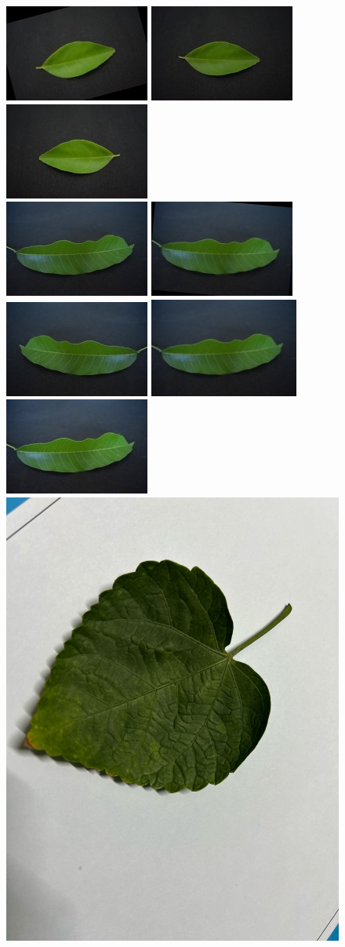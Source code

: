 \documentclass[twocolumn]{article}
\begin{document}
\begin{figure}[t]
\begin{minipage}{0.85\columnwidth}
\includegraphics[width=0.2\columnwidth]{img/lemon/lemon3.jpg}%
\includegraphics[width=0.2\columnwidth]{img/lemon/lemon4.jpg}%
\includegraphics[width=0.2\columnwidth]{img/lemon/lemon5.jpg}\\[-0.5pt]
\includegraphics[width=0.2\columnwidth]{img/mango/mango1.jpg}%
\includegraphics[width=0.2\columnwidth]{img/mango/mango2.jpg}%
\includegraphics[width=0.2\columnwidth]{img/mango/mango3.jpg}%
\includegraphics[width=0.2\columnwidth]{img/mango/mango4.jpg}%
\includegraphics[width=0.2\columnwidth]{img/mango/mango5.jpg}\\[-0.5pt]
\includegraphics[width=0.2\columnwidth]{img/rosa/rosa1.jpg}%

\end{minipage}
\end{figure}
\end{document}
